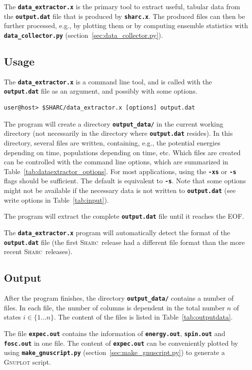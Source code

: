 \documentclass[a4paper,10pt,DIV=15,openany]{scrbook}
\newcommand{\sharc}{\textsc{Sharc}}
\newcommand{\ttt}[1]{\textbf{\texttt{#1}}}
\begin{document}
The \ttt{data\_extractor.x} is the primary tool to extract useful, tabular data from the \ttt{output.dat} file that is produced by \ttt{sharc.x}.
The produced files can then be further processed, e.g., by plotting them or by computing ensemble statistics with \ttt{data\_collector.py} (section~\ref{sec:data_collector.py}).


\subsection{Usage}

The \ttt{data\_extractor.x} is a command line tool, and is called with the \ttt{output.dat} file as an argument, and possibly with some options.
\begin{verbatim}
user@host> $SHARC/data_extractor.x [options] output.dat
\end{verbatim}
The program will create a directory \ttt{output\_data/} in the current working directory (not necessarily in the directory where \ttt{output.dat} resides). In this directory, several files are written, containing, e.g., the potential energies depending on time, populations depending on time, etc.
Which files are created can be controlled with the command line options, which are summarized in Table~\ref{tab:dataextractor_options}. For most applications, using the \ttt{-xs} or \ttt{-s} flags should be sufficient. The default is equivalent to \ttt{-s}.
Note that some options might not be available if the necessary data is not written to \ttt{output.dat} (see write options in Table~\ref{tab:input}).

The program will extract the complete \ttt{output.dat} file until it reaches the EOF. 

The \ttt{data\_extractor.x} program will automatically detect the format of the \ttt{output.dat} file (the first \sharc\ release had a different file format than the more recent \sharc\ releases).

\subsection{Output}

After the program finishes, the directory \ttt{output\_data/} contains a number of files. In each file, the number of columns is dependent in the total number $n$ of states $i\in\{1...n\}$. The content of the files is listed in Table~\ref{tab:outputdata}.

The file \ttt{expec.out} contains the information of \ttt{energy.out}, \ttt{spin.out} and \ttt{fosc.out} in one file. The content of \ttt{expec.out} can be conveniently plotted by using \ttt{make\_gnuscript.py} (section~\ref{sec:make_gnuscript.py}) to generate a \textsc{Gnuplot} script.
\end{document}
